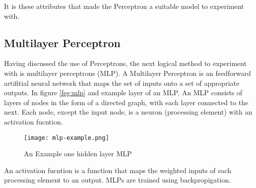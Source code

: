 \documentclass[bsc,frontabs,twoside,singlespacing,parskip,deptreport]{infthesis}     %
\begin{document}
It is these attributes that made the Perceptron a suitable model to experiment with.
\subsection{Multilayer Perceptron}
Having discussed the use of Perceptrons, the next logical method to experiment with is multilayer perceptrons (MLP).
A Multilayer Perceptron is an feedforward artifitial neural network that maps the set of inputs
onto a set of appropriate outputs.
In figure \ref{feg:mlp} and example layer of an MLP.
An MLP consists of layers of  nodes in the form of a directed graph, with each layer connected to the next.
Each node, except the input node, is a neuron (processing element) with an activation fucntion.

\begin{figure}
  \centering
  \texttt{[image: mlp-example.png]}
  \caption{An Example one hidden layer MLP \cite{scikit-learn}}
  \label{fig:mlp}
\end{figure}

An activation fucntion is a function that maps the weighted inputs of each processing element to an output.
MLPs are trained using backpropigation.
\end{document}
